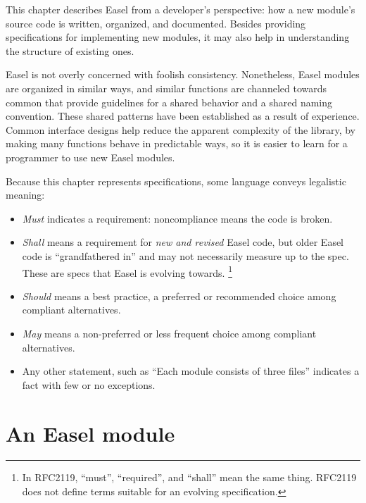 
This chapter describes Easel from a developer's perspective: how a new
module's source code is written, organized, and documented.  Besides
providing specifications for implementing new modules, it may also
help in understanding the structure of existing ones.

Easel is not overly concerned with foolish consistency. Nonetheless,
Easel modules are organized in similar ways, and similar functions are
channeled towards common  that provide guidelines
for a shared behavior and a shared naming convention. These shared
patterns have been established as a result of experience. Common
interface designs help reduce the apparent complexity of the library,
by making many functions behave in predictable ways, so it is easier
to learn for a programmer to use new Easel modules.

Because this chapter represents specifications, some language conveys
legalistic meaning:

\begin{itemize} 
\item \emph{Must} indicates a requirement: noncompliance means the
code is broken.

\item \emph{Shall} means a requirement for \emph{new and revised}
Easel code, but older Easel code is ``grandfathered in'' and may not
necessarily measure up to the spec. These are specs that Easel is
evolving towards. \footnote{In RFC2119, ``must'', ``required'', and
``shall'' mean the same thing. RFC2119 does not define terms suitable
for an evolving specification.}

\item \emph{Should} means a best practice, a preferred or recommended
choice among compliant alternatives.

\item \emph{May} means a non-preferred or less frequent choice among
compliant alternatives.

\item Any other statement, such as ``Each module consists of three
files'' indicates a fact with few or no exceptions.
\end{itemize}


\section{An Easel module}

